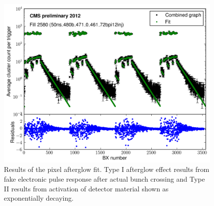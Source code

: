 \begin{figure}[H]
  \centering
  \includegraphics[width=0.5\columnwidth]{./afterglow.png}
  \caption{Results of the pixel afterglow fit. Type I afterglow effect results from fake electronic pulse response after actual bunch crossing and Type II results from activation of detector material shown as exponentially decaying. }
  \label{fig:LHC}
\end{figure}




